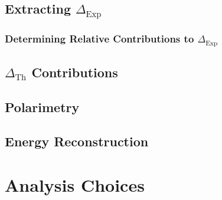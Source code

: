 \subsection{Extracting $\Delta_{\mathrm{Exp}}$}

\subsubsection{Determining Relative Contributions to $\Delta_{\mathrm{Exp}}$}

\subsection{$\Delta_{\mathrm{Th}}$ Contributions}

\subsection{Polarimetry}

\subsection{Energy Reconstruction}


\section{Analysis Choices}












